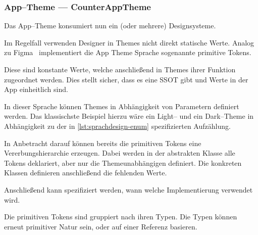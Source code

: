 \subsubsection{App--Theme --- CounterAppTheme}
Das App--Theme konsumiert nun ein (oder mehrere) Designsysteme.

Im Regelfall verwenden Designer in Themes nicht direkt statische Werte.
Analog zu Figma~\autocite{figma-inc-no-date} implementiert die App Theme Sprache sogenannte primitive Tokens.


Diese sind konstante Werte, welche anschließend in Themes ihrer Funktion zugeordnet werden.
Dies stellt sicher, dass es eine \ac{SSOT} gibt und Werte in der App einheitlich sind.

In dieser Sprache können Themes in Abhängigkeit von Parametern definiert werden.
Das klassischste Beispiel hierzu wäre ein Light-- und ein Dark--Theme in Abhängigkeit zu der in \autoref{lst:sprachdesign-enum} spezifizierten Aufzählung.

In Anbetracht darauf können bereits die primitiven Tokens eine Vererbungshierarchie erzeugen.
Dabei werden in der abstrakten Klasse alle Tokens deklariert, aber nur die Themeunabhängigen definiert.
Die konkreten Klassen definieren anschließend die fehlenden Werte.

Anschließend kann spezifiziert werden, wann welche Implementierung verwendet wird.

Die primitiven Tokens sind gruppiert nach ihren Typen.
Die Typen können erneut primitiver Natur sein, oder auf einer Referenz basieren.


